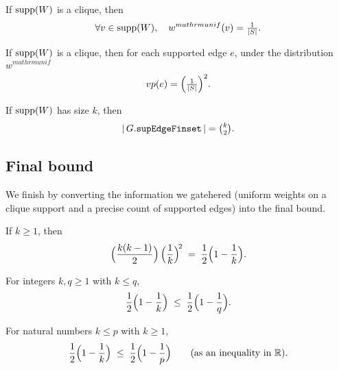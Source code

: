 \begin{lemma}\label{lem:UniformBetter-constant}
If \(\operatorname{supp}(W)\) is a clique, then
\[
  \forall v\in\operatorname{supp}(W),\quad w^{mathrm{unif}}(v)=\tfrac{1}{|S|}.
\]
\leanok
\end{lemma}

\begin{lemma}\label{lem:UniformBetter-edges}
If \(\operatorname{supp}(W)\) is a clique, then for each supported edge \(e\), under the distribution $w^{mathrm{unif}}$
\[
  vp(e) = \Bigl(\tfrac{1}{|S|}\Bigr)^2.
\]
\leanok
\end{lemma}


\begin{lemma}\label{lem:clique-size}
If \(\operatorname{supp}(W)\) has size \(k\), then
\[
  |\,G.\texttt{supEdgeFinset}\,| = \tbinom{k}{2}.
\]
\leanok
\end{lemma}

\subsection{Final bound}

We finish by converting the information we gatehered (uniform weights on a
clique support and a precise count of supported edges) into the final bound.

\begin{lemma}[Ccomputation]\label{lem:computation}
\leanok
If $k\ge 1$, then
\[
  \Bigl(\frac{k(k-1)}{2}\Bigr)\,\Bigl(\frac{1}{k}\Bigr)^{\!2}
  \;=\; \frac12\Bigl(1-\frac1k\Bigr).
\]
\end{lemma}

\begin{lemma}\label{lem:bound}
\leanok
For integers $k,q\ge 1$ with $k\le q$,
\[
  \frac12\Bigl(1-\frac1k\Bigr)\;\le\;\frac12\Bigl(1-\frac1q\Bigr).
\]
\end{lemma}

\begin{lemma}\label{lem:bound-real}
\leanok
For natural numbers $k\le p$ with $k\ge 1$,
\[
  \frac12\Bigl(1-\frac1k\Bigr)\;\le\;\frac12\Bigl(1-\frac1p\Bigr)
  \qquad(\text{as an inequality in } \mathbb R).
\]
\end{lemma}

\begin{lemma}\label{lem:cast-help}
\leanok
\end{lemma}

